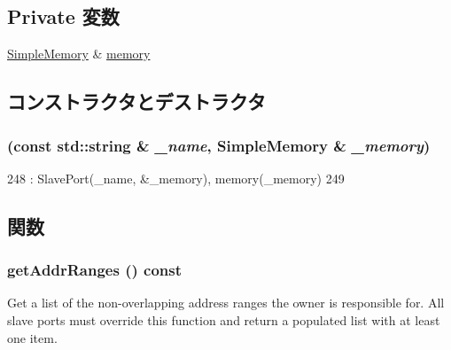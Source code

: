 \subsection*{Private 変数}
\begin{DoxyCompactItemize}
\item 
\hyperlink{classSimpleMemory_1_1SimpleMemory}{SimpleMemory} \& \hyperlink{classSimpleMemory_1_1MemoryPort_a491d0d7a4dc46129e8f4dbe03d916ccf}{memory}
\end{DoxyCompactItemize}


\subsection{コンストラクタとデストラクタ}
\hypertarget{classSimpleMemory_1_1MemoryPort_ae97acd31fada9d8bd39445f55ed4febc}{
\subsubsection[{MemoryPort}]{ (const std::string \& {\em \_\-name}, \/  {\bf SimpleMemory} \& {\em \_\-memory})}}
\label{classSimpleMemory_1_1MemoryPort_ae97acd31fada9d8bd39445f55ed4febc}



\begin{DoxyCode}
248     : SlavePort(_name, &_memory), memory(_memory)
249 { }
\end{DoxyCode}


\subsection{関数}
\hypertarget{classSimpleMemory_1_1MemoryPort_a36cf113d5e5e091ebddb32306c098fae}{
\subsubsection[{getAddrRanges}]{ getAddrRanges () const}}
\label{classSimpleMemory_1_1MemoryPort_a36cf113d5e5e091ebddb32306c098fae}
Get a list of the non-\/overlapping address ranges the owner is responsible for. All slave ports must override this function and return a populated list with at least one item.

